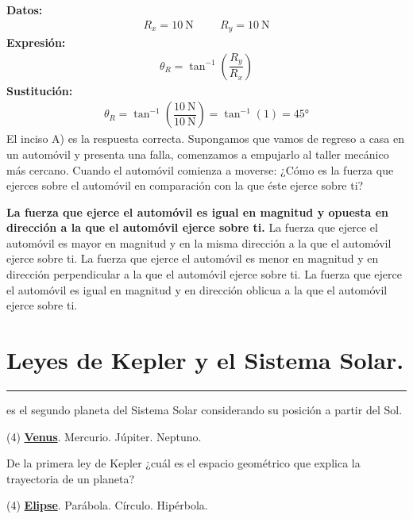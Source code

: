 \documentclass[12pt, letter]{exam}
\begin{document}
\begin{questions}
    \textbf{Datos:}
    \begin{align*}
    R_{x} = \SI{10}{\newton} \hspace{1cm} R_{y} = \SI{10}{\newton}
    \end{align*}
    \textbf{Expresión:}
    \begin{align*}
    \theta_{R} = \tan^{-1} \left( \dfrac{R_{y}}{R_{x}} \right)
    \end{align*}
    \textbf{Sustitución:}
    \begin{align*}
        \theta_{R} = \tan^{-1} \left( \dfrac{\SI{10}{\newton}}{\SI{10}{\newton}} \right) = \tan^{-1} (1) = \ang{45}
    \end{align*}
    El inciso A) es la respuesta correcta.
    \question Supongamos que vamos de regreso a casa en un automóvil y presenta una falla, comenzamos a empujarlo al taller mecánico más cercano. Cuando el automóvil comienza a moverse: ¿Cómo es la fuerza que ejerces sobre el automóvil en comparación con la que éste ejerce sobre ti? 
    \begin{tasks}
        \task \textbf{La fuerza que ejerce el automóvil es igual en magnitud y opuesta en dirección a la que el automóvil ejerce sobre ti.}
        \task La fuerza que ejerce el automóvil es mayor en magnitud y en la misma dirección a la que el automóvil ejerce sobre ti.
        \task La fuerza que ejerce el automóvil es menor en magnitud y en dirección perpendicular a la que el automóvil ejerce sobre ti.
        \task La fuerza que ejerce el automóvil es igual en magnitud y en dirección oblicua a la que el automóvil ejerce sobre ti.
    \end{tasks}

    \section{Leyes de Kepler y el Sistema Solar.}
    
    \question \rule{2cm}{0.1mm} es el segundo planeta del Sistema Solar considerando su posición a partir del Sol.
    \begin{tasks}(4)
        \task \underline{\textbf{Venus}}.
        \task Mercurio.
        \task Júpiter.
        \task Neptuno.
    \end{tasks}
    \question De la primera ley de Kepler ¿cuál es el espacio geométrico que explica la trayectoria de un planeta?
    \begin{tasks}(4)
        \task \underline{\textbf{Elipse}}.
        \task Parábola.
        \task Círculo.
        \task Hipérbola.
    \end{tasks}
    
\end{questions}
\end{document}
